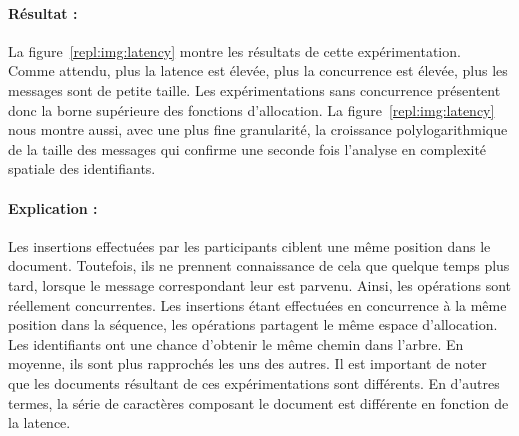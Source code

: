\paragraph{Résultat :} La figure~\ref{repl:img:latency} montre les résultats de
cette expérimentation. Comme attendu, plus la latence est élevée, plus la
concurrence est élevée, plus les messages sont de petite taille. Les
expérimentations sans concurrence présentent donc la borne supérieure des
fonctions d'allocation. La figure~\ref{repl:img:latency} nous montre aussi, avec
une plus fine granularité, la croissance polylogarithmique de la taille des
messages qui confirme une seconde fois l'analyse en complexité spatiale des
identifiants.

\paragraph{Explication :} Les insertions effectuées par les participants ciblent
une même position dans le document. Toutefois, ils ne prennent connaissance de
cela que quelque temps plus tard, lorsque le message correspondant leur est
parvenu. Ainsi, les opérations sont réellement concurrentes. Les insertions
étant effectuées en concurrence à la même position dans la séquence, les
opérations partagent le même espace d'allocation. Les identifiants ont une
chance d'obtenir le même chemin dans l'arbre. En moyenne, ils sont plus
rapprochés les uns des autres. Il est important de noter que les documents
résultant de ces expérimentations sont différents. En d'autres termes, la série
de caractères composant le document est différente en fonction de la latence.


